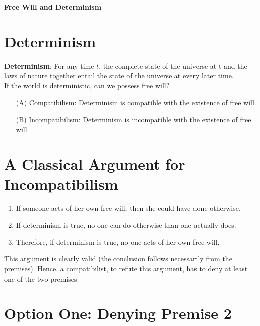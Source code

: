 \documentclass[11pt]{article}
\theoremstyle{definition}
\begin{document}




\begin{center}
{\LARGE \bf Free Will and Determinism}
\end{center}

\smallskip

\section*{Determinism}

\textbf{Determinism}: For any time $t$, the complete state of the universe at t and the laws of nature together entail the state of the universe at every later time. \\

\noindent
If the world is deterministic, can we possess free will?

\begin{enumerate}
\item[(A)] Compatibilism: Determinism is compatible with the existence of free will.
\item[(B)] Incompatibilism: Determinism is incompatible with the existence of free will.
\end{enumerate}

\section*{A Classical Argument for Incompatibilism}

\begin{enumerate}
\item If someone acts of her own free will, then she could have done otherwise.
\item If determinism is true, no one can do otherwise than one actually does.
\item Therefore, if determinism is true, no one acts of her own free will.
\end{enumerate}

This argument is clearly valid (the conclusion follows necessarily from the premises). Hence, a compatibilist, to refute this argument, has to deny at least one of the two premises.

\section*{Option One: Denying Premise 2}
\end{document}
